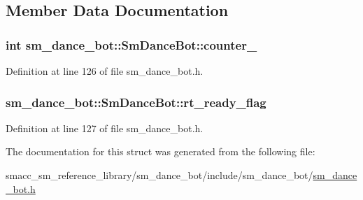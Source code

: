 \subsection{Member Data Documentation}
\subsubsection[{\texorpdfstring{counter\+\_\+1}{counter_1}}]{\setlength{\rightskip}{0pt plus 5cm}int sm\+\_\+dance\+\_\+bot\+::\+Sm\+Dance\+Bot\+::counter\+\_}\hypertarget{structsm__dance__bot_1_1SmDanceBot_ab3b8db557ce94d34c60b291911eb140c}{}\label{structsm__dance__bot_1_1SmDanceBot_ab3b8db557ce94d34c60b291911eb140c}


Definition at line 126 of file sm\+\_\+dance\+\_\+bot.\+h.

\subsubsection[{\texorpdfstring{rt\+\_\+ready\+\_\+flag}{rt_ready_flag}}]{ sm\+\_\+dance\+\_\+bot\+::\+Sm\+Dance\+Bot\+::rt\+\_\+ready\+\_\+flag}\hypertarget{structsm__dance__bot_1_1SmDanceBot_a0f0587a13670ad8925555cd8f6cb6b2d}{}\label{structsm__dance__bot_1_1SmDanceBot_a0f0587a13670ad8925555cd8f6cb6b2d}


Definition at line 127 of file sm\+\_\+dance\+\_\+bot.\+h.



The documentation for this struct was generated from the following file\+:\begin{DoxyCompactItemize}
\item 
smacc\+\_\+sm\+\_\+reference\+\_\+library/sm\+\_\+dance\+\_\+bot/include/sm\+\_\+dance\+\_\+bot/\hyperlink{sm__dance__bot_8h}{sm\+\_\+dance\+\_\+bot.\+h}\end{DoxyCompactItemize}
